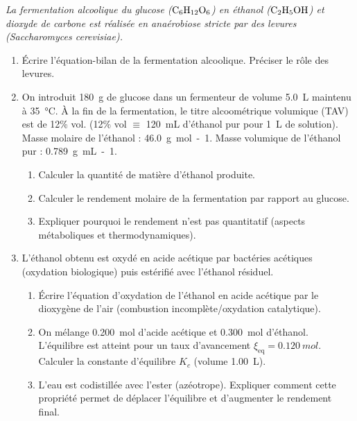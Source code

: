 \documentclass[11pt]{article}
\begin{document}
\begin{exercice}
\emph{La fermentation alcoolique du glucose ($\ce{C6H12O6}$) en éthanol ($\ce{C2H5OH}$) et dioxyde de carbone est réalisée en anaérobiose stricte par des levures (\textit{Saccharomyces cerevisiae}).}
\begin{enumerate}
    \item Écrire l'équation-bilan de la fermentation alcoolique. Préciser le rôle des levures.
    \item On introduit \SI{180}{g} de glucose dans un fermenteur de volume \SI{5,0}{L} maintenu à \SI{35}{\celsius}. À la fin de la fermentation, le titre alcoométrique volumique (TAV) est de 12\% vol. (12\% vol $\equiv$ \SI{120}{mL} d'éthanol pur pour \SI{1}{L} de solution). Masse molaire de l'éthanol : \SI{46,0}{g.mol-1}. Masse volumique de l'éthanol pur : \SI{0,789}{g.mL-1}.
    \begin{enumerate}
        \item Calculer la quantité de matière d'éthanol produite.
        \item Calculer le rendement molaire de la fermentation par rapport au glucose.
        \item Expliquer pourquoi le rendement n'est pas quantitatif (aspects métaboliques et thermodynamiques).
    \end{enumerate}
    \item L'éthanol obtenu est oxydé en acide acétique par bactéries acétiques (oxydation biologique) puis estérifié avec l'éthanol résiduel.
    \begin{enumerate}
        \item Écrire l'équation d'oxydation de l'éthanol en acide acétique par le dioxygène de l'air (combustion incomplète/oxydation catalytique).
        \item On mélange \SI{0,200}{mol} d'acide acétique et \SI{0,300}{mol} d'éthanol. L'équilibre est atteint pour un taux d'avancement $\xi_{\text{eq}} = \SI{0,120}{mol}$. Calculer la constante d'équilibre $K_c$ (volume \SI{1,00}{L}).
        \item L'eau est codistillée avec l'ester (azéotrope). Expliquer comment cette propriété permet de déplacer l'équilibre et d'augmenter le rendement final.
    \end{enumerate}
\end{enumerate}
\end{exercice}
\end{document}
